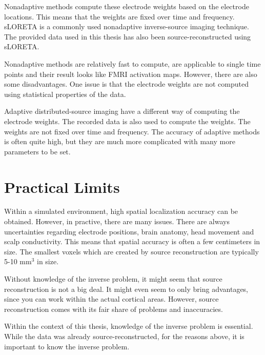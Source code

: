 Nonadaptive methods compute these electrode weights based on the electrode locations. This means that the weights are fixed over time and frequency. sLORETA is a commonly used nonadaptive inverse-source imaging technique. The provided data used in this thesis has also been source-reconstructed using sLORETA.

Nonadaptive methods are relatively fast to compute, are applicable to single time points and their result looks like FMRI activation maps. However, there are also some disadvantages. One issue is that the electrode weights are not computed using statistical properties of the data. 

Adaptive distributed-source imaging have a different way of computing the electrode weights. The recorded data is also used to compute the weights. The weights are not fixed over time and frequency. The accuracy of adaptive methods is often quite high, but they are much more complicated with many more parameters to be set. 

\section{Practical Limits}

Within a simulated environment, high spatial localization accuracy can be obtained. However, in practive, there are many issues. There are always uncertainties regarding electrode positions, brain anatomy, head movement and scalp conductivity. This means that spatial accuracy is often a few centimeters in size. The smallest voxels which are created by source reconstruction are typically 5-10 mm$^3$ in size. 

Without knowledge of the inverse problem, it might seem that source reconstruction is not a big deal. It might even seem to only bring advantages, since you can work within the actual cortical areas. However, source reconstruction comes with its fair share of problems and inaccuracies. 

Within the context of this thesis, knowledge of the inverse problem is essential. While the data was already source-reconstructed, for the reasons above, it is important to know the inverse problem. 